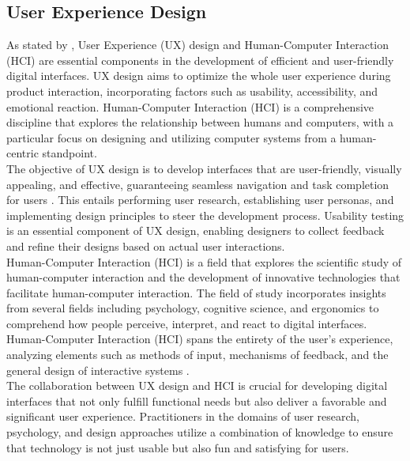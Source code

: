 \subsection{User Experience Design}
As stated by \textcite{olawole18}, User Experience (UX) design and Human-Computer Interaction (HCI) are essential components in the development of efficient and user-friendly digital interfaces. UX design aims to optimize the whole user experience during product interaction, incorporating factors such as usability, accessibility, and emotional reaction. Human-Computer Interaction (HCI) is a comprehensive discipline that explores the relationship between humans and computers, with a particular focus on designing and utilizing computer systems from a human-centric standpoint. \\

The objective of UX design is to develop interfaces that are user-friendly, visually appealing, and effective, guaranteeing seamless navigation and task completion for users \parencite{olawole18}. This entails performing user research, establishing user personas, and implementing design principles to steer the development process. Usability testing is an essential component of UX design, enabling designers to collect feedback and refine their designs based on actual user interactions. \\

Human-Computer Interaction (HCI) is a field that explores the scientific study of human-computer interaction and the development of innovative technologies that facilitate human-computer interaction. The field of study incorporates insights from several fields including psychology, cognitive science, and ergonomics to comprehend how people perceive, interpret, and react to digital interfaces. Human-Computer Interaction (HCI) spans the entirety of the user's experience, analyzing elements such as methods of input, mechanisms of feedback, and the general design of interactive systems \parencite{olawole18}. \\

The collaboration between UX design and HCI is crucial for developing digital interfaces that not only fulfill functional needs but also deliver a favorable and significant user experience. Practitioners in the domains of user research, psychology, and design approaches utilize a combination of knowledge to ensure that technology is not just usable but also fun and satisfying for users.


